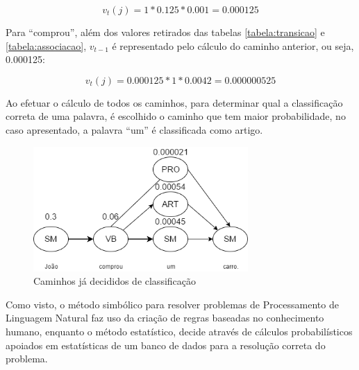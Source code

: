 \[ v_t(j) = 1 * 0.125 * 0.001 = 0.000125 \]

Para ``comprou'', além dos valores retirados das tabelas \ref{tabela:transicao}
e \ref{tabela:associacao}, $v_{t-1}$ é representado pelo cálculo do
caminho anterior, ou seja, 0.000125:

\[ v_t(j) = 0.000125 * 1 * 0.0042 = 0.000000525 \]

Ao efetuar o cálculo de todos os caminhos, para determinar qual a classificação
correta de uma palavra, é escolhido o caminho que tem maior probabilidade, no
caso apresentado, a palavra ``um'' é classificada como artigo.

\begin{figure}[htbp]
\centering
\includegraphics[height=180px]{imagens/markov2.png}
\caption{Caminhos já decididos de classificação}
\label{fig:markov2}
\end{figure}

Como visto, o método simbólico para resolver problemas de Processamento de
Linguagem Natural faz uso da criação de regras baseadas no conhecimento humano,
enquanto o método estatístico, decide através de cálculos probabilísticos
apoiados em estatísticas de um banco de dados para a resolução correta do
problema.


%
%
%

